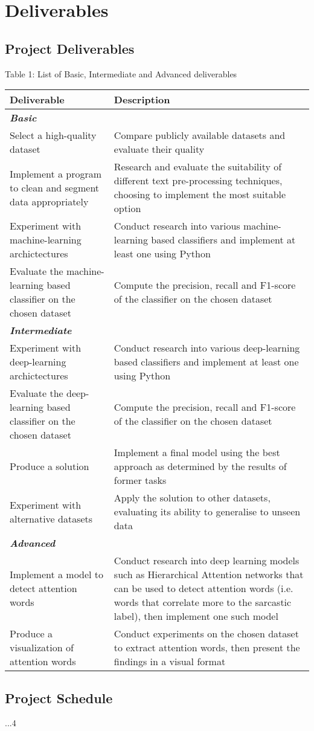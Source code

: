 \documentclass[12pt,a4paper]{article}
\begin{document}
\newpage

\section{Deliverables}
\subsection{Project Deliverables}
\begin{center}
	Table 1: List of Basic, Intermediate and Advanced deliverables
\end{center}
\begin{tabular}{p{5cm}p{10cm}}
	\hline
	\textbf{Deliverable} & \textbf{Description}\\
	\hline\hline
	\multicolumn{2}{l}{\textit{\textbf{Basic}}} \\
	\hline \hline
	Select a high-quality dataset   &  Compare publicly available datasets and evaluate their quality\\
	\hline
	Implement a program to clean and segment data appropriately   & Research and evaluate the suitability of different text pre-processing techniques, choosing to implement the most suitable option\\
	\hline
	Experiment with machine-learning archictectures & Conduct research into various machine-learning based classifiers and implement at least one using Python\\
	\hline
	Evaluate the machine-learning based classifier on the chosen dataset & Compute the precision, recall and F1-score of the classifier on the chosen dataset\\
	\hline \hline
	\multicolumn{2}{l}{\textit{\textbf{Intermediate}}} \\
	\hline \hline
	Experiment with deep-learning archictectures & Conduct research into various deep-learning based classifiers and implement at least one using Python\\
	\hline
	Evaluate the deep-learning based classifier on the chosen dataset & Compute the precision, recall and F1-score of the classifier on the chosen dataset\\
	\hline
	Produce a solution & Implement a final model using the best approach as determined by the results of former tasks\\
	\hline
	Experiment with alternative datasets & Apply the solution to other datasets, evaluating its ability to generalise to unseen data \\
	\hline \hline
	\multicolumn{2}{l}{\textit{\textbf{Advanced}}} \\
	\hline \hline	
	Implement a model to detect attention words &   Conduct research into deep learning models such as Hierarchical Attention networks that can be used to detect attention words (i.e. words that correlate more to the sarcastic label), then implement one such model\\
	\hline
	Produce a visualization of attention words & Conduct experiments on the chosen dataset to extract attention words, then present the findings in a visual format \\
	\hline
\end{tabular}

\subsection{Project Schedule}
...4 

\newpage
\end{document}
